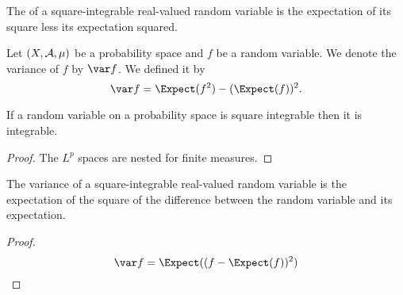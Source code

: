 
\sbasic




















\sstart
{}


The 
of a square-integrable
real-valued random variable
is the expectation of its
square less its expectation
squared.


Let $(X, \mathcal{A}, \mu)$
be a probability space
and $f$ be a random variable.
We denote the variance
of $f$ by $\var f$.
We defined it by
\[
  \var f = \Expect(f^2) - (\Expect(f))^2.
\]


\begin{prop}
  If a random
  variable on a probability
  space is square integrable
  then it is integrable.
  \begin{proof}
    The $L^p$ spaces are nested
    for finite measures.
  \end{proof}
\end{prop}

\begin{prop}
The variance of a
square-integrable
real-valued random
variable is
the expectation
of the square of
the difference between
the random variable
and its expectation.
\begin{proof}
\[
  \var f = \Expect((f - \Expect(f))^2)
\]
\end{proof}
\end{prop}
\strats
